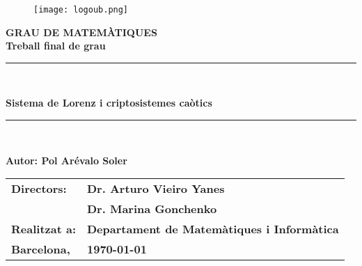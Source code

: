 \documentclass[11pt,a4paper,openright,oneside]{article}
\numberwithin{equation}{section}
\theoremstyle{definition}
\begin{document}

\thispagestyle{empty}


\setlength\parindent{0pt} %

\begin{titlepage}
\begin{center}
\begin{figure}[htb]
\begin{center}
\texttt{[image: logoub.png]}
\end{center}
\end{figure}

\vspace*{1cm}
\textbf{\LARGE GRAU DE MATEMÀTIQUES } \\
\vspace*{.5cm}
\textbf{\LARGE Treball final de grau} \\

\vspace*{1.5cm}
\rule{16cm}{0.1mm}\\
\begin{Huge}
\textbf{Sistema de Lorenz i criptosistemes caòtics} \\
\end{Huge}
\rule{16cm}{0.1mm}\\

\vspace{1cm}

\begin{flushright}
\textbf{\LARGE Autor: Pol Arévalo Soler}

\vspace*{2cm}

\renewcommand{\arraystretch}{1.5}
\begin{tabular}{ll}
\textbf{\Large Directors:} & \textbf{\Large Dr. Arturo Vieiro Yanes} \\
&\textbf{\Large Dr. Marina Gonchenko} \\
\textbf{\Large Realitzat a:} & \textbf{\Large  Departament de Matemàtiques i Informàtica}
\\
\textbf{\Large Barcelona,} & \textbf{\Large \today }
\end{tabular}

\end{flushright}

\end{center}

\end{titlepage}


\newpage
{} 
\end{document}
